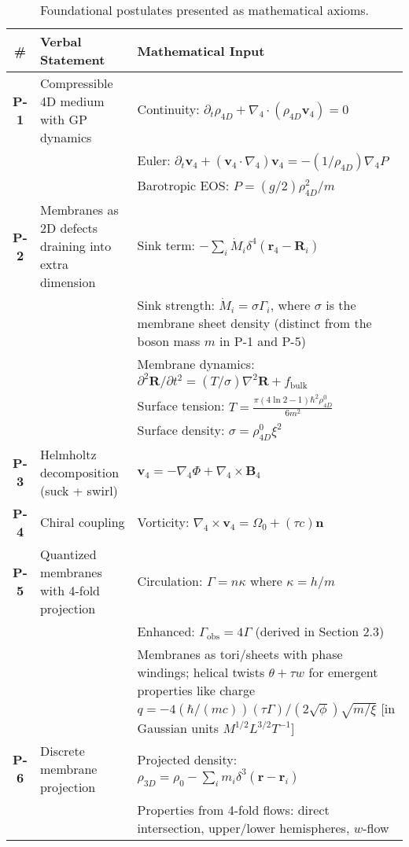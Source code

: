 \begin{table}[H]
\centering
\begin{tabularx}{\textwidth}{|c|Y|Y|}
\hline
\# & Verbal Statement & Mathematical Input \\
\hline
\textbf{P-1} & Compressible 4D medium with GP dynamics & Continuity: $\partial_t \rho_{4D} + \nabla_4 \cdot (\rho_{4D} \mathbf{v}_4) = 0$ \\
& & Euler: $\partial_t \mathbf{v}_4 + (\mathbf{v}_4 \cdot \nabla_4) \mathbf{v}_4 = -(1/\rho_{4D}) \nabla_4 P$ \\
& & Barotropic EOS: $P = (g/2) \rho_{4D}^2 / m$ \\
\hline
\textbf{P-2} & Membranes as 2D defects draining into extra dimension & Sink term: $-\sum_i \dot{M}_i \delta^4(\mathbf{r}_4 - \mathbf{R}_i)$ \\
& & Sink strength: $\dot{M}_i = \sigma \Gamma_i$, where $\sigma$ is the membrane sheet density (distinct from the boson mass $m$ in P-1 and P-5) \\
& & Membrane dynamics: $\partial^2 \mathbf{R}/\partial t^2 = (T/\sigma) \nabla^2 \mathbf{R} + f_{\text{bulk}}$ \\
& & Surface tension: $T = \frac{\pi (4 \ln 2 - 1) \hbar^2 \rho_{4D}^0}{6 m^2}$ \\
& & Surface density: $\sigma = \rho_{4D}^0 \xi^2$ \\
\hline
\textbf{P-3} & Helmholtz decomposition (suck + swirl) & $\mathbf{v}_4 = -\nabla_4 \Phi + \nabla_4 \times \mathbf{B}_4$ \\
\hline
\textbf{P-4} & Chiral coupling & Vorticity: $\nabla_4 \times \mathbf{v}_4 = \Omega_0 + (\tau c) \mathbf{n}$ \\
\hline
\textbf{P-5} & Quantized membranes with 4-fold projection & Circulation: $\Gamma = n \kappa$ where $\kappa = h / m$ \\
& & Enhanced: $\Gamma_{\text{obs}} = 4 \Gamma$ (derived in Section 2.3) \\
& & Membranes as tori/sheets with phase windings; helical twists $\theta + \tau w$ for emergent properties like charge $q = -4 (\hbar / (m c)) (\tau \Gamma) / (2 \sqrt{\phi}) \sqrt{m / \xi}$ [in Gaussian units $M^{1/2} L^{3/2} T^{-1}$] \\
\hline
\textbf{P-6} & Discrete membrane projection & Projected density: $\rho_{3D} = \rho_0 - \sum_i m_i \delta^3(\mathbf{r} - \mathbf{r}_i)$ \\
& & Properties from 4-fold flows: direct intersection, upper/lower hemispheres, $w$-flow \\
\hline
\end{tabularx}
\caption{Foundational postulates presented as mathematical axioms.}
\label{tab:postulates}
\end{table}

